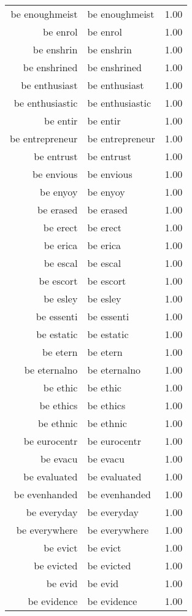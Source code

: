 \begin{table}[ht]
\begin{tabular}{rlr}
  be enoughmeist & be enoughmeist & 1.00 \\ 
  be enrol & be enrol & 1.00 \\ 
  be enshrin & be enshrin & 1.00 \\ 
  be enshrined & be enshrined & 1.00 \\ 
  be enthusiast & be enthusiast & 1.00 \\ 
  be enthusiastic & be enthusiastic & 1.00 \\ 
  be entir & be entir & 1.00 \\ 
  be entrepreneur & be entrepreneur & 1.00 \\ 
  be entrust & be entrust & 1.00 \\ 
  be envious & be envious & 1.00 \\ 
  be enyoy & be enyoy & 1.00 \\ 
  be erased & be erased & 1.00 \\ 
  be erect & be erect & 1.00 \\ 
  be erica & be erica & 1.00 \\ 
  be escal & be escal & 1.00 \\ 
  be escort & be escort & 1.00 \\ 
  be esley & be esley & 1.00 \\ 
  be essenti & be essenti & 1.00 \\ 
  be estatic & be estatic & 1.00 \\ 
  be etern & be etern & 1.00 \\ 
  be eternalno & be eternalno & 1.00 \\ 
  be ethic & be ethic & 1.00 \\ 
  be ethics & be ethics & 1.00 \\ 
  be ethnic & be ethnic & 1.00 \\ 
  be eurocentr & be eurocentr & 1.00 \\ 
  be evacu & be evacu & 1.00 \\ 
  be evaluated & be evaluated & 1.00 \\ 
  be evenhanded & be evenhanded & 1.00 \\ 
  be everyday & be everyday & 1.00 \\ 
  be everywhere & be everywhere & 1.00 \\ 
  be evict & be evict & 1.00 \\ 
  be evicted & be evicted & 1.00 \\ 
  be evid & be evid & 1.00 \\ 
  be evidence & be evidence & 1.00 \\ 

\end{tabular}
\end{table}
